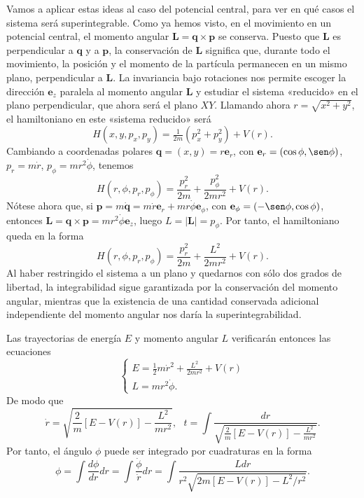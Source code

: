 \documentclass[11pt,a4paper,twoside]{article}
\theoremstyle{definition} \newtheorem{defn}[thm]{Definición}
\theoremstyle{definition} \newtheorem{ejemplo}[thm]{Ejemplo}
\theoremstyle{definition} \newtheorem{ejercicio}[thm]{Ejercicio}
\theoremstyle{remark} \newtheorem*{obs}{Observación}
\newcommand{\vect}[1]{\mathbf{#1}}
\begin{document}
  Vamos a aplicar estas ideas al caso del potencial central, para ver en qué casos el sistema será superintegrable. Como ya hemos visto, en el movimiento en un potencial central, el momento angular $\vect{L}=\vect{q}\times \vect{p}$ se conserva. Puesto que $\vect{L}$ es perpendicular a $\vect{q}$ y a $\vect{p}$, la conservación de $\vect{L}$ significa que, durante todo el movimiento, la posición y el momento de la partícula permanecen en un mismo plano, perpendicular a $\vect{L}$. La invariancia bajo rotaciones nos permite escoger la dirección $\vect{e}_z$ paralela al momento angular $\vect{L}$ y estudiar el sistema «reducido» en el plano perpendicular, que ahora será el plano $XY$. Llamando ahora $r=\sqrt{x^2+y^2}$, el hamiltoniano en este «sistema reducido» será
  \begin{equation}
    H(x,y,p_x,p_y)= \tfrac{1}{2m}(p_x^2+p_y^2)+V(r).
  \end{equation}
  Cambiando a coordenadas polares $\vect{q}=(x,y)=r\vect{e}_{r}$, con $\vect{e}_r=(\cos \phi, \sen \phi)$, $p_r=m\dot r$, $p_{\phi}=mr^2\dot \phi$, tenemos
  \begin{equation}
    H(r,\phi,p_r,p_{\phi})=\frac{p_r^2}{2m}+\frac{p_{\phi}^2}{2mr^2}+V(r). 
  \end{equation}
  Nótese ahora que, si $\vect{p}=m\dot{\vect{q}}=m\dot r \vect{e}_r + mr \dot \phi \vect{e}_{\phi}$, con $\vect{e}_{\phi}=(-\sen \phi,\cos \phi)$, entonces $\vect{L}=\vect{q}\times \vect{p}=mr^2\dot \phi \vect{e}_z$, luego $L=|\vect{L}|=p_{\phi}$. Por tanto, el hamiltoniano queda en la forma
  \begin{equation}
    H(r,\phi,p_r,p_{\phi})=\frac{p_r^2}{2m}+\frac{L^2}{2mr^2}+V(r). 
  \end{equation}
  Al haber restringido el sistema a un plano y quedarnos con sólo dos grados de libertad, la integrabilidad sigue garantizada por la conservación del momento angular, mientras que la existencia de una cantidad conservada adicional independiente del momento angular nos daría la superintegrabilidad.

  Las trayectorias de energía $E$ y momento angular $L$ verificarán entonces las ecuaciones
  \begin{equation}
    \begin{cases}
    E=\tfrac{1}{2}m\dot r^2+\frac{L^2}{2mr^2}+V(r) \\
    L=mr^2\dot \phi.
  \end{cases}
  \end{equation}
  De modo que
  \begin{equation}
      \dot r=\sqrt{\frac{2}{m}[E-V(r)]-\frac{L^2}{mr^2}}, \ \ \  
    t=\int \frac{dr}{\sqrt{\frac{2}{m}[E-V(r)]-\frac{L^2}{mr^2}}}.
  \end{equation}
  Por tanto, el ángulo $\phi$ puede ser integrado por cuadraturas en la forma
  \begin{equation}
    \phi=\int \frac{d\phi}{dr}dr=\int \frac{\dot{\phi}}{\dot{r}}dr=\int\frac{Ldr}{r^2\sqrt{2m[E-V(r)]-L^2/r^2}}. 
    \label{eq:intphi}
  \end{equation}
\end{document}
